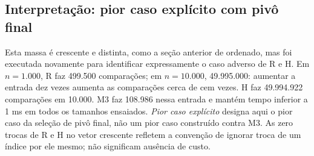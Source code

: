 \subsection*{Interpretação: pior caso explícito com pivô final}
Esta massa é crescente e distinta, como a seção anterior de ordenado, mas foi executada novamente para identificar expressamente o caso adverso de R e H. Em $n=1.000$, R faz 499.500 comparações; em $n=10.000$, 49.995.000: aumentar a entrada dez vezes aumenta as comparações cerca de cem vezes. H faz 49.994.922 comparações em 10.000. M3 faz 108.986 nessa entrada e mantém tempo inferior a 1 ms em todos os tamanhos ensaiados. \emph{Pior caso explícito} designa aqui o pior caso da seleção de pivô final, não um pior caso construído contra M3. As zero trocas de R e H no vetor crescente refletem a convenção de ignorar troca de um índice por ele mesmo; não significam ausência de custo.
